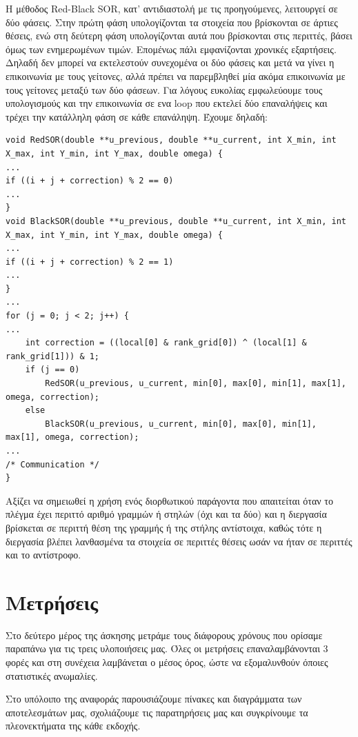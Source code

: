 \documentclass[12pt,titlepage]{article}
\begin{document}
Η μέθοδος Red-Black SOR, κατ' αντιδιαστολή με τις προηγούμενες, λειτουργεί σε
δύο φάσεις. Στην πρώτη φάση υπολογίζονται τα στοιχεία που βρίσκονται σε άρτιες
θέσεις, ενώ στη δεύτερη φάση υπολογίζονται αυτά που βρίσκονται στις περιττές,
βάσει όμως των ενημερωμένων τιμών. Επομένως πάλι εμφανίζονται χρονικές
εξαρτήσεις. Δηλαδή δεν μπορεί να εκτελεστούν συνεχομένα οι δύο φάσεις και μετά
να γίνει η επικοινωνία με τους γείτονες, αλλά πρέπει να παρεμβληθεί μία ακόμα
επικοινωνία με τους γείτονες μεταξύ των δύο φάσεων. Για λόγους ευκολίας
εμφωλεύουμε τους υπολογισμούς και την επικοινωνία σε ενα loop που εκτελεί δύο
επαναλήψεις και τρέχει την κατάλληλη φάση σε κάθε επανάληψη. Έχουμε δηλαδή:

\begin{verbatim}
void RedSOR(double **u_previous, double **u_current, int X_min, int X_max, int Y_min, int Y_max, double omega) {
...
if ((i + j + correction) % 2 == 0)
...
}
void BlackSOR(double **u_previous, double **u_current, int X_min, int X_max, int Y_min, int Y_max, double omega) {
...
if ((i + j + correction) % 2 == 1)
...
}
...
for (j = 0; j < 2; j++) {
...
    int correction = ((local[0] & rank_grid[0]) ^ (local[1] & rank_grid[1])) & 1;
    if (j == 0)
        RedSOR(u_previous, u_current, min[0], max[0], min[1], max[1], omega, correction);
    else
        BlackSOR(u_previous, u_current, min[0], max[0], min[1], max[1], omega, correction);
...
/* Communication */
}
\end{verbatim}

Αξίζει να σημειωθεί η χρήση ενός διορθωτικού παράγοντα που απαιτείται όταν το
πλέγμα έχει περιττό αριθμό γραμμών ή στηλών (όχι και τα δύο) και η διεργασία
βρίσκεται σε περιττή θέση της γραμμής ή της στήλης αντίστοιχα, καθώς τότε η
διεργασία βλέπει λανθασμένα τα στοιχεία σε περιττές θέσεις ωσάν να ήταν σε
περιττές και το αντίστροφο.

\newpage

\section{Μετρήσεις}

Στο δεύτερο μέρος της άσκησης μετράμε τους διάφορους χρόνους που ορίσαμε
παραπάνω για τις τρεις υλοποιήσεις μας. Όλες οι μετρήσεις επαναλαμβάνονται 3
φορές και στη συνέχεια λαμβάνεται ο μέσος όρος, ώστε να εξομαλυνθούν όποιες
στατιστικές ανωμαλίες.

Στο υπόλοιπο της αναφοράς παρουσιάζουμε πίνακες και διαγράμματα των
αποτελεσμάτων μας, σχολιάζουμε τις παρατηρήσεις μας και συγκρίνουμε τα
πλεονεκτήματα της κάθε εκδοχής.
\end{document}
